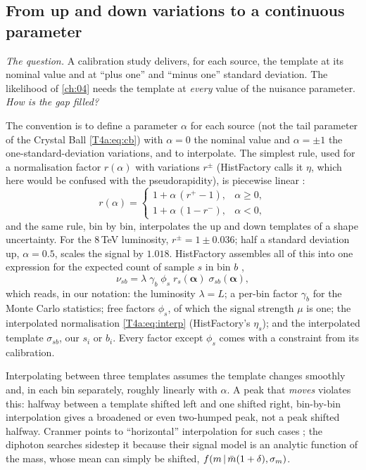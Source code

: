 \subsection{From up and down variations to a continuous parameter}
\label{T4a:sec:interp}

\emph{The question.} A calibration study delivers, for each source, the template at its nominal value and at ``plus one'' and ``minus one'' standard deviation. The likelihood of \cref{ch:04} needs the template at \emph{every} value of the nuisance parameter. \emph{How is the gap filled?}

The convention is to define a parameter $\alpha$ for each source (not the tail parameter of the Crystal Ball \eqref{T4a:eq:cb}) with $\alpha=0$ the nominal value and $\alpha=\pm1$ the one-standard-deviation variations, and to interpolate. The simplest rule, used for a normalisation factor $r(\alpha)$ with variations $r^\pm$ (HistFactory calls it $\eta$, which here would be confused with the pseudorapidity), is piecewise linear \cite[(23)--(25)]{Cranmer2015}:
\begin{equation}
  r(\alpha)=
  \begin{cases}
    1+\alpha\,(r^+-1), & \alpha\ge0,\\
    1+\alpha\,(1-r^-), & \alpha<0,
  \end{cases}
  \label{T4a:eq:interp}
\end{equation}
and the same rule, bin by bin, interpolates the up and down templates of a shape uncertainty. For the $8$\,TeV luminosity, $r^\pm=1\pm0.036$; half a standard deviation up, $\alpha=0.5$, scales the signal by $1.018$. HistFactory assembles all of this into one expression for the expected count of sample $s$ in bin $b$ \cite[(6)]{HistFactory2012},
\begin{equation}
  \nu_{sb}=\lambda\;\gamma_b\;\phi_s\;r_s(\bm\alpha)\;\sigma_{sb}(\bm\alpha),
  \label{T4a:eq:histfactory}
\end{equation}
which reads, in our notation: the luminosity $\lambda=L$; a per-bin factor $\gamma_b$ for the Monte Carlo statistics; free factors $\phi_s$, of which the signal strength $\mu$ is one; the interpolated normalisation \eqref{T4a:eq:interp} (HistFactory's $\eta_s$); and the interpolated template $\sigma_{sb}$, our $s_i$ or $b_i$. Every factor except $\phi_s$ comes with a constraint from its calibration.

\begin{pitfall}
Interpolating between three templates assumes the template changes smoothly and, in each bin separately, roughly linearly with $\alpha$. A peak that \emph{moves} violates this: halfway between a template shifted left and one shifted right, bin-by-bin interpolation gives a broadened or even two-humped peak, not a peak shifted halfway. Cranmer points to ``horizontal'' interpolation for such cases \cite[Sec.~4.1.5]{Cranmer2015}; the diphoton searches sidestep it because their signal model is an analytic function of the mass, whose mean can simply be shifted, $f(m\,\vert\,\bar m(1+\delta),\sigma_m)$.
\end{pitfall}

